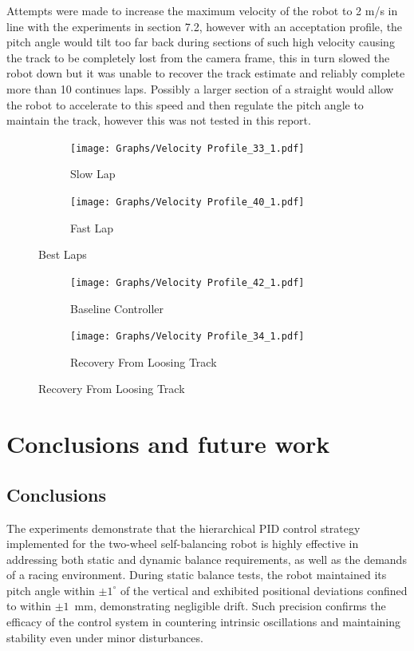     Attempts were made to increase the maximum velocity of the robot to 2 m/s in line with the experiments in section 7.2, however with an acceptation profile, the pitch angle would 
    tilt too far back during sections of such high velocity causing the track to be completely lost from the camera frame, this in turn slowed the robot down but it was unable to recover the track 
    estimate and reliably complete more than 10 continues laps. Possibly a larger section of a straight would allow the robot to accelerate to this speed and then regulate the pitch
    angle to maintain the track, however this was not tested in this report.
   
    \begin{figure} [H]
        \centering
        \begin{subfigure}[b]{0.48\textwidth}
            \texttt{[image: Graphs/Velocity Profile\_33\_1.pdf]}
            \caption{Slow Lap}
            \label{fig:Slow Lap}
        \end{subfigure}
        \hfill
        \begin{subfigure}[b]{0.48\textwidth}
            \texttt{[image: Graphs/Velocity Profile\_40\_1.pdf]}
            \caption{Fast Lap}
            \label{fig:Fast Lap}
        \end{subfigure}
        \caption{Best Laps}
    \end{figure}  

    \begin{figure} [H]
        \centering
        \begin{subfigure}[b]{0.48\textwidth}
            \texttt{[image: Graphs/Velocity Profile\_42\_1.pdf]}
            \caption{Baseline Controller}
            \label{fig:baseline}
        \end{subfigure}
        \hfill
        \begin{subfigure}[b]{0.48\textwidth}
            \texttt{[image: Graphs/Velocity Profile\_34\_1.pdf]}
            \caption{Recovery From Loosing Track}
            \label{fig:Fail Recovery}
        \end{subfigure}
    \end{figure}




  \section{Conclusions and future work} 
  \subsection{Conclusions}
    The experiments demonstrate that the hierarchical PID control strategy implemented for the two-wheel self-balancing robot is 
    highly effective in addressing both static and dynamic balance requirements, as well as the demands of a racing environment.
    During static balance tests, the robot maintained its pitch angle within $\pm1^\circ$ of the vertical and exhibited positional 
    deviations confined to within $\pm1$~mm, demonstrating negligible drift.
    Such precision confirms the efficacy of the control system in countering intrinsic oscillations and maintaining stability even under minor disturbances.

